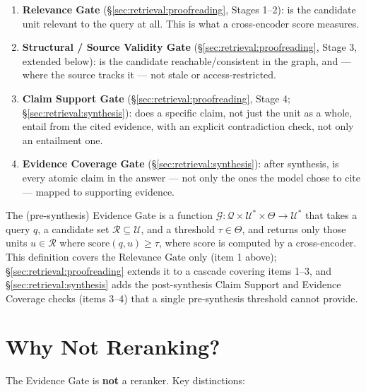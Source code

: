 \begin{enumerate}
  \item \textbf{Relevance Gate} (\S\ref{sec:retrieval:proofreading}, Stages 1--2): is the candidate unit relevant to the query at all. This is what a cross-encoder score measures.
  \item \textbf{Structural / Source Validity Gate} (\S\ref{sec:retrieval:proofreading}, Stage 3, extended below): is the candidate reachable/consistent in the graph, and --- where the source tracks it --- not stale or access-restricted.
  \item \textbf{Claim Support Gate} (\S\ref{sec:retrieval:proofreading}, Stage 4; \S\ref{sec:retrieval:synthesis}): does a specific claim, not just the unit as a whole, entail from the cited evidence, with an explicit contradiction check, not only an entailment one.
  \item \textbf{Evidence Coverage Gate} (\S\ref{sec:retrieval:synthesis}): after synthesis, is every atomic claim in the answer --- not only the ones the model chose to cite --- mapped to supporting evidence.
\end{enumerate}

\begin{definition}
\label{def:evidence-gate}
The (pre-synthesis) Evidence Gate is a function $\mathcal{G}: \mathcal{Q} \times \mathcal{U}^* \times \Theta \to \mathcal{U}^*$ that takes a query $q$, a candidate set $\mathcal{R} \subseteq \mathcal{U}$, and a threshold $\tau \in \Theta$, and returns only those units $u \in \mathcal{R}$ where $\text{score}(q, u) \geq \tau$, where $\text{score}$ is computed by a cross-encoder. This definition covers the Relevance Gate only (item 1 above); \S\ref{sec:retrieval:proofreading} extends it to a cascade covering items 1--3, and \S\ref{sec:retrieval:synthesis} adds the post-synthesis Claim Support and Evidence Coverage checks (items 3--4) that a single pre-synthesis threshold cannot provide.
\end{definition}

\section{Why Not Reranking?}
\label{sec:retrieval:not-rerank}

The Evidence Gate is \textbf{not} a reranker. Key distinctions:

